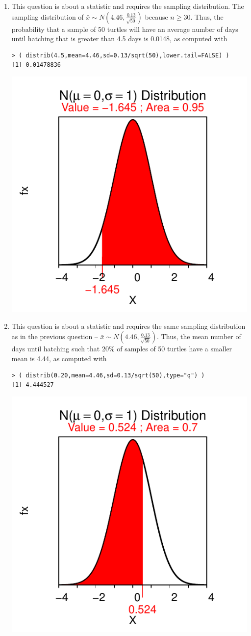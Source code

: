 \documentclass[10pt,openany]{book}\usepackage[]{graphicx}\usepackage[]{color}
\makeatletter
\newenvironment{kframe}{%
 \def\at@end@of@kframe{}%
 \ifinner\ifhmode%
  \def\at@end@of@kframe{\end{minipage}}%
  \begin{minipage}{\columnwidth}%
 \fi\fi%
 \def\FrameCommand##1{\hskip\@totalleftmargin \hskip-\fboxsep
 \colorbox{shadecolor}{##1}\hskip-\fboxsep
     \hskip-\linewidth \hskip-\@totalleftmargin \hskip\columnwidth}%
 \MakeFramed {\advance\hsize-\width
   \@totalleftmargin\z@ \linewidth\hsize
   \@setminipage}}%
 {\par\unskip\endMakeFramed%
 \at@end@of@kframe}
\newenvironment{knitrout}{}{} %
\makeatother
\begin{document}
\begin{itemize}
\begin{enumerate}
\begin{knitrout}
{}



\end{knitrout}
       \item This question is about a statistic and requires the sampling distribution.  The sampling distribution of $\bar{x}\sim N(4.46,\frac{0.13}{\sqrt{50}})$ because $n \geq 30$.  Thus, the probability that a sample of 50 turtles will have an average number of days until hatching that is greater than 4.5 days is 0.0148, as computed with
\begin{knitrout}
\color{fgcolor}\begin{kframe}
\begin{verbatim}
> ( distrib(4.5,mean=4.46,sd=0.13/sqrt(50),lower.tail=FALSE) )
[1] 0.01478836
\end{verbatim}
\end{kframe}

{\centering \includegraphics[width=.4\linewidth]{Figs/unnamed-chunk-331-1} 

}



\end{knitrout}
       \item This question is about a statistic and requires the same sampling distribution as in the previous question -- $\bar{x}\sim N(4.46,\frac{0.13}{\sqrt{50}})$.  Thus, the mean number of days until hatching such that 20\% of samples of 50 turtles have a smaller mean is 4.44, as computed with
\begin{knitrout}
\color{fgcolor}\begin{kframe}
\begin{verbatim}
> ( distrib(0.20,mean=4.46,sd=0.13/sqrt(50),type="q") )
[1] 4.444527
\end{verbatim}
\end{kframe}

{\centering \includegraphics[width=.4\linewidth]{Figs/unnamed-chunk-332-1} 

}
\end{knitrout}
\end{enumerate}
\end{itemize}
\end{document}
